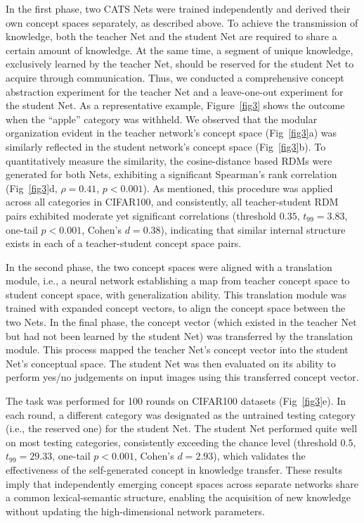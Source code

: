 \documentclass[pdflatex,sn-mathphys-num,lineno]{sn-jnl}%
\begin{document}
\begin{CJK}{UTF8}{gbsn}
In the first phase, two CATS Nets were trained independently and derived their own concept spaces separately, as described above. To achieve the transmission of knowledge, both the teacher Net and the student Net are required to share a certain amount of knowledge. At the same time, a segment of unique knowledge, exclusively learned by the teacher Net, should be reserved for the student Net to acquire through communication. Thus, we conducted a comprehensive concept abstraction experiment for the teacher Net and a leave-one-out experiment for the student Net. As a representative example, Figure~\ref{fig3} shows the outcome when the “apple” category was withheld. We observed that the modular organization evident in the teacher network's concept space (Fig~\ref{fig3}a) was similarly reflected in the student network's concept space (Fig~\ref{fig3}b). To quantitatively measure the similarity, the cosine-distance based RDMs were generated for both Nets, exhibiting a significant Spearman’s rank correlation (Fig~\ref{fig3}d, $\rho=0.41$, $p < 0.001$). As mentioned, this procedure was applied across all categories in CIFAR100, and consistently, all teacher-student RDM pairs exhibited moderate yet significant correlations (threshold $0.35$, $t_{99}=3.83$, one-tail $p < 0.001$, Cohen's $d = 0.38$), indicating that similar internal structure exists in each of a teacher-student concept space pairs.

In the second phase, the two concept spaces were aligned with a translation module, i.e., a neural network establishing a map from teacher concept space to student concept space, with generalization ability. This translation module was trained with expanded concept vectors, to align the concept space between the two Nets. In the final phase, the concept vector (which existed in the teacher Net but had not been learned by the student Net) was transferred by the translation module. This process mapped the teacher Net's concept vector into the student Net's conceptual space. The student Net was then evaluated on its ability to perform yes/no judgements on input images using this transferred concept vector.

The task was performed for 100 rounds on CIFAR100 datasets (Fig~\ref{fig3}e). In each round, a different category was designated as the untrained testing category (i.e., the reserved one) for the student Net. The student Net performed quite well on most testing categories, consistently exceeding the chance level (threshold $0.5$, $t_{99}=29.33$, one-tail $p < 0.001$, Cohen's $d=2.93$), which validates the effectiveness of the self-generated concept in knowledge transfer. These results imply that independently emerging concept spaces across separate networks share a common lexical-semantic structure, enabling the acquisition of new knowledge without updating the high-dimensional network parameters.


\end{CJK}
\end{document}
